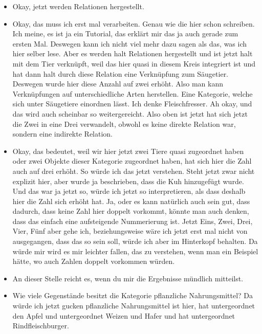 {\begin{itemize}[]
            \item {} Okay, jetzt werden Relationen hergestellt.
            \item {} Okay, das muss ich erst mal verarbeiten.
                  Genau wie die hier schon schreiben.
                  Ich meine, es ist ja ein Tutorial, das erklärt mir das ja auch gerade zum ersten Mal.
                  Deswegen kann ich nicht viel mehr dazu sagen als das, was ich hier selber lese.
                  Aber es werden halt Relationen hergestellt und ist jetzt halt mit dem Tier verknüpft, weil das hier quasi in diesem Kreis integriert ist und hat dann halt durch diese Relation eine Verknüpfung zum Säugetier.
                  Deswegen wurde hier diese Anzahl auf zwei erhöht.
                  Also man kann Verknüpfungen auf unterschiedliche Arten herstellen.
                  Eine Kategorie, welche sich unter Säugetiere einordnen lässt.
                  Ich denke Fleischfresser.
                  Ah okay, und das wird auch scheinbar so weitergereicht.
                  Also oben ist jetzt hat sich jetzt die Zwei in eine Drei verwandelt, obwohl es keine direkte Relation war, sondern eine indirekte Relation.
            \item {} Okay, das bedeutet, weil wir hier jetzt zwei Tiere quasi zugeordnet haben oder zwei Objekte dieser Kategorie zugeordnet haben, hat sich hier die Zahl auch auf drei erhöht.
                  So würde ich das jetzt verstehen.
                  Steht jetzt zwar nicht explizit hier, aber wurde ja beschrieben, dass die Kuh hinzugefügt wurde.
                  Und das war ja jetzt so, würde ich jetzt so interpretieren, als dass deshalb hier die Zahl sich erhöht hat.
                  Ja, oder es kann natürlich auch sein gut, dass dadurch, dass keine Zahl hier doppelt vorkommt, könnte man auch denken, dass das einfach eine aufsteigende Nummerierung ist.
                  Jetzt Eins, Zwei, Drei, Vier, Fünf aber gehe ich, beziehungsweise wäre ich jetzt erst mal nicht von ausgegangen, dass das so sein soll, würde ich aber im Hinterkopf behalten.
                  Da würde mir wird es mir leichter fallen, das zu verstehen, wenn man ein Beispiel hätte, wo auch Zahlen doppelt vorkommen würden.
            \item {} An dieser Stelle reicht es, wenn du mir die Ergebnisse mündlich mitteilst.
            \item {} Wie viele Gegenstände besitzt die Kategorie pflanzliche Nahrungsmittel? Da würde ich jetzt gucken pflanzliche Nahrungsmittel ist hier, hat untergeordnet den Apfel und untergeordnet Weizen und Hafer und hat untergeordnet Rindfleischburger.

\end{itemize}}
